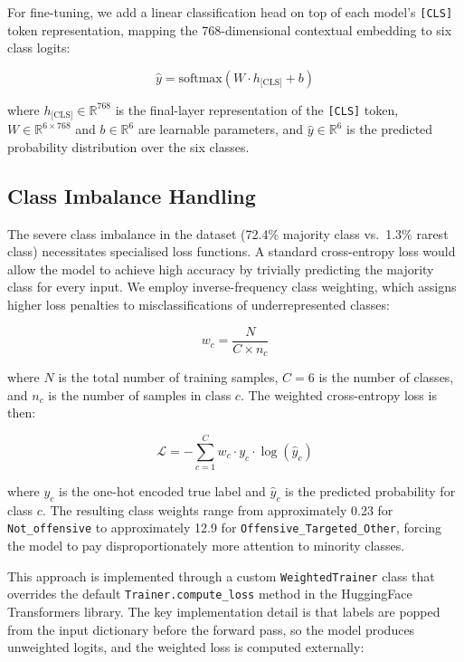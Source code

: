 \documentclass[12pt, a4paper]{article}
\begin{document}
For fine-tuning, we add a linear classification head on top of each model's \texttt{[CLS]} token representation, mapping the 768-dimensional contextual embedding to six class logits:

\begin{equation}
\hat{y} = \text{softmax}(W \cdot h_{\text{[CLS]}} + b)
\label{eq:classification}
\end{equation}

\noindent where $h_{\text{[CLS]}} \in \mathbb{R}^{768}$ is the final-layer representation of the \texttt{[CLS]} token, $W \in \mathbb{R}^{6 \times 768}$ and $b \in \mathbb{R}^{6}$ are learnable parameters, and $\hat{y} \in \mathbb{R}^{6}$ is the predicted probability distribution over the six classes.

\subsection{Class Imbalance Handling}

The severe class imbalance in the dataset (72.4\% majority class vs.\ 1.3\% rarest class) necessitates specialised loss functions. A standard cross-entropy loss would allow the model to achieve high accuracy by trivially predicting the majority class for every input. We employ inverse-frequency class weighting, which assigns higher loss penalties to misclassifications of underrepresented classes:

\begin{equation}
w_c = \frac{N}{C \times n_c}
\label{eq:class_weights}
\end{equation}

\noindent where $N$ is the total number of training samples, $C = 6$ is the number of classes, and $n_c$ is the number of samples in class $c$. The weighted cross-entropy loss is then:

\begin{equation}
\mathcal{L} = -\sum_{c=1}^{C} w_c \cdot y_c \cdot \log(\hat{y}_c)
\label{eq:weighted_ce}
\end{equation}

\noindent where $y_c$ is the one-hot encoded true label and $\hat{y}_c$ is the predicted probability for class $c$. The resulting class weights range from approximately 0.23 for \texttt{Not\_offensive} to approximately 12.9 for \texttt{Offensive\_Targeted\_Other}, forcing the model to pay disproportionately more attention to minority classes.

This approach is implemented through a custom \texttt{WeightedTrainer} class that overrides the default \texttt{Trainer.compute\_loss} method in the HuggingFace Transformers library. The key implementation detail is that labels are popped from the input dictionary before the forward pass, so the model produces unweighted logits, and the weighted loss is computed externally:
\end{document}
